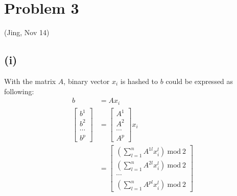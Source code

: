\documentclass[twoside,11pt]{homework}
\date{\today} %
\begin{document}
\maketitle

\section*{Problem 3}
\color{blue} (Jing, Nov 14)
\color{black}
\subsection*{(i)}
With the matrix $A$, binary vector $x_i$ is hashed to $b$ could be expressed as following:
%
\begin{equation}
\begin{split}
b &= A x_i \\
\left[\begin{matrix} b^1 \\b^2\\ \cdots \\b^p \end{matrix} \right]&= \left[\begin{matrix} A^1  \\A^2 \\ \cdots \\A^p \end{matrix} \right]  x_i\\
&= \left[\begin{matrix} (\sum\limits_{l=1}^n A^{1l} x_i^l)\ \mathrm{mod}\ 2\\ (\sum\limits_{l=1}^n A^{2l} x_i^l)\ \mathrm{mod}\ 2\\ \cdots \\ (\sum\limits_{l=1}^n A^{pl} x_i^l)\ \mathrm{mod}\ 2 \end{matrix} \right]
\end{split}
\end{equation}
\end{document}

